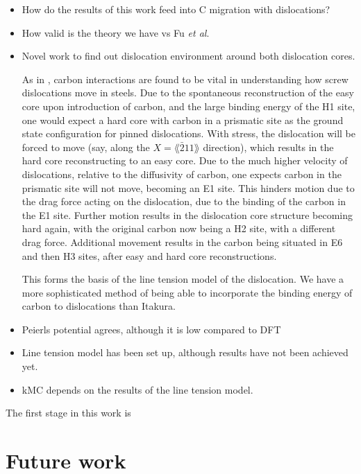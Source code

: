 \documentclass[a4paper,11pt]{article}
\begin{document}
\begin{itemize}
\item How do the results of this work feed into C migration with
dislocations?
\item How valid is the theory we have vs Fu \emph{et al}.
\item Novel work to find out dislocation environment around both dislocation cores.

As in \cite{Lthi2019}, carbon interactions are found to be vital in understanding how screw
dislocations move in steels. Due to the spontaneous reconstruction of the easy core upon
introduction of carbon, and the large binding energy of the H1 site, one would expect a hard
core with carbon in a prismatic site as the ground state configuration for pinned
dislocations. With stress, the dislocation will be forced to move (say, along the \(X =
    \lang\bar{2}11\rang\) direction), which results in the hard core reconstructing to an easy core. Due to
the much higher velocity of dislocations, relative to the diffusivity of carbon, one expects
carbon in the prismatic site will not move, becoming an E1 site. This hinders motion due to the
drag force acting on the dislocation, due to the binding of the carbon in the E1 site. Further
motion results in the dislocation core structure becoming hard again, with the original carbon
now being a H2 site, with a different drag force. Additional movement results in the carbon
being situated in E6 and then H3 sites, after easy and hard core reconstructions.

This forms the basis of the line tension model of the dislocation. We have a more sophisticated
method of being able to incorporate the binding energy of carbon to dislocations than Itakura.

\item Peierls potential agrees, although it is low compared to DFT
\item Line tension model has been set up, although results have not been achieved yet.
\item kMC depends on the results of the line tension model.
\end{itemize}

The first stage in this work is 



\section{Future work}
\label{sec:org014fa10}
\end{document}
